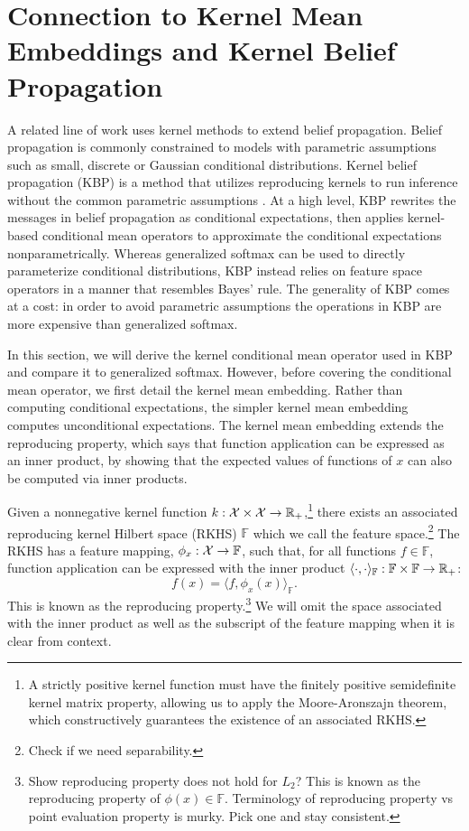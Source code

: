\documentclass{article}
\begin{document}
\section{Connection to Kernel Mean Embeddings and Kernel Belief Propagation}
A related line of work uses kernel methods to extend belief propagation.
Belief propagation is commonly constrained to models with parametric assumptions such as
small, discrete or Gaussian conditional distributions.
Kernel belief propagation (KBP) is a method that utilizes reproducing kernels
to run inference without the common parametric assumptions \citep{song2010tree,song2011kernelbp}.
At a high level, KBP rewrites the messages in belief propagation as conditional
expectations, then applies kernel-based conditional mean operators
to approximate the conditional expectations nonparametrically.
Whereas generalized softmax can be used to directly parameterize conditional distributions,
KBP instead relies on feature space operators in a manner that resembles Bayes' rule.
The generality of KBP comes at a cost: in order to avoid parametric assumptions
the operations in KBP are more expensive than generalized softmax.

In this section, we will derive the kernel conditional mean operator
used in KBP and compare it to generalized softmax.
However, before covering the conditional mean operator, we first
detail the kernel mean embedding.
Rather than computing conditional expectations,
the simpler kernel mean embedding computes unconditional expectations.
The kernel mean embedding extends the reproducing property,
which says that function application can be expressed as an inner product,
by showing that the expected values of functions of $x$ can also
be computed via inner products.

Given a nonnegative kernel function $k:\mathcal{X}\times\mathcal{X}\to\mathbb{R}_+$,\footnote{
A strictly positive kernel function must have the finitely positive semidefinite
kernel matrix property, allowing us to apply the Moore-Aronszajn theorem,
which constructively guarantees the existence of an associated RKHS.
}
there exists an associated reproducing kernel Hilbert space (RKHS) $\mathbb{F}$
which we call the feature space.\footnote{
Check if we need separability.
}
The RKHS has a feature mapping, $\phi_x:\mathcal{X}\to\mathbb{F}$,
such that, for all functions $f\in\mathbb{F}$,
function application can be expressed with the inner product
$\langle\cdot,\cdot\rangle_\mathbb{F}:\mathbb{F}\times\mathbb{F}\to\mathbb{R}_+$:
$$f(x) = \langle f, \phi_x(x)\rangle_\mathbb{F}.$$
This is known as the reproducing property.\footnote{
Show reproducing property does not hold for $L_2$?
This is known as the reproducing property of $\phi(x)\in\mathbb{F}$.
Terminology of reproducing property vs point evaluation property is murky.
Pick one and stay consistent.
}
We will omit the space associated with the inner product as
well as the subscript of the feature mapping when it is clear from context.
\end{document}
